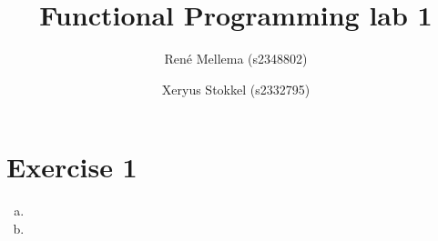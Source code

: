 \documentclass[a4paper]{article}
\title{Functional Programming lab 1}
\author{Ren\'e Mellema (s2348802) \and Xeryus Stokkel (s2332795)}
\begin{document}
\maketitle

\section*{Exercise 1}
\begin{enumerate}[(a)]
	\item 

	\item 
\end{enumerate}


\end{document}
